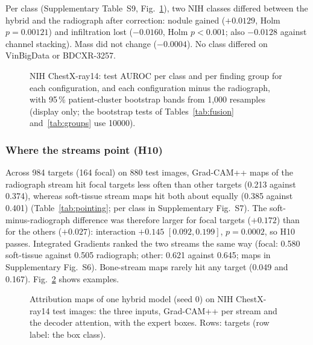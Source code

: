 Per class (Supplementary Table~S9, Fig.~\ref{fig:cls_per_class}), two NIH classes differed between the hybrid and the radiograph after
correction: nodule gained ($+0.0129$, Holm $p=0.00121$) and infiltration lost ($-0.0160$, Holm $p<0.001$; also $-0.0128$ against channel
stacking). Mass did not change ($-0.0004$). No class differed on VinBigData or BDCXR-3257.

\begin{figure}[!t]
\centering
{}
\caption{NIH ChestX-ray14: test AUROC per class and per finding group for each configuration, and each configuration minus the
radiograph, with 95\,\% patient-cluster bootstrap bands from 1,000 resamples (display only; the bootstrap tests of
Tables~\ref{tab:fusion} and~\ref{tab:groups} use \num{10000}).}
\label{fig:cls_per_class}
\end{figure}

\subsubsection{Where the streams point (H10)}
Across 984 targets (164 focal) on 880 test images, Grad-CAM++ maps of the radiograph stream hit focal targets less often than other targets
(0.213 against 0.374), whereas soft-tissue stream maps hit both about equally (0.385 against 0.401) (Table~\ref{tab:pointing};
per class in Supplementary Fig.~S7). The soft-minus-radiograph difference was therefore larger for focal targets ($+0.172$) than for the others
($+0.027$): interaction $+0.145$ $[0.092,0.199]$, $p=0.0002$, so H10 passes. Integrated Gradients ranked the two streams the same way
(focal: 0.580 soft-tissue against 0.505 radiograph; other: 0.621 against 0.645; maps in Supplementary Fig.~S6). Bone-stream maps rarely hit
any target (0.049 and 0.167). Fig.~\ref{fig:cls_maps} shows examples.

\begin{table}[!t]
\centering
\caption{H10: pointing-game hit rates on the NIH expert boxes, means over targets of the per-target means over the five hybrid models;
tolerance 15\,px at 256\,px. Last row: soft-tissue minus radiograph stream (Grad-CAM++) and the interaction with its 95\,\%
image-cluster bootstrap interval.}
\label{tab:pointing}
\end{table}

\begin{figure}[!t]
\centering
{}
\caption{Attribution maps of one hybrid model (seed 0) on NIH ChestX-ray14 test images: the three inputs, Grad-CAM++ per stream and the
decoder attention, with the expert boxes. Rows: targets (row label: the box class).}
\label{fig:cls_maps}
\end{figure}

